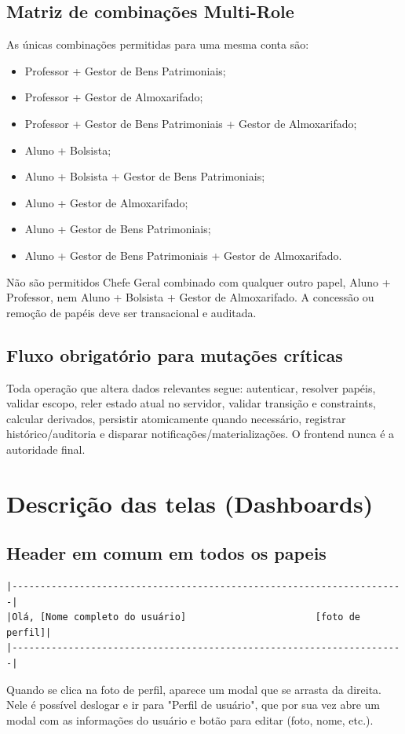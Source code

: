 \documentclass[12pt,a4paper]{article}
\begin{document}
\subsection{Matriz de combinações Multi-Role}
As únicas combinações permitidas para uma mesma conta são:
\begin{itemize}
    \item Professor + Gestor de Bens Patrimoniais;
    \item Professor + Gestor de Almoxarifado;
    \item Professor + Gestor de Bens Patrimoniais + Gestor de Almoxarifado;
    \item Aluno + Bolsista;
    \item Aluno + Bolsista + Gestor de Bens Patrimoniais;
    \item Aluno + Gestor de Almoxarifado;
    \item Aluno + Gestor de Bens Patrimoniais;
    \item Aluno + Gestor de Bens Patrimoniais + Gestor de Almoxarifado.
\end{itemize}
Não são permitidos Chefe Geral combinado com qualquer outro papel, Aluno + Professor, nem Aluno + Bolsista + Gestor de Almoxarifado. A concessão ou remoção de papéis deve ser transacional e auditada.

\subsection{Fluxo obrigatório para mutações críticas}
Toda operação que altera dados relevantes segue: autenticar, resolver papéis, validar escopo, reler estado atual no servidor, validar transição e constraints, calcular derivados, persistir atomicamente quando necessário, registrar histórico/auditoria e disparar notificações/materializações. O frontend nunca é a autoridade final.

\section{Descrição das telas (Dashboards)}
\subsection{Header em comum em todos os papeis}
\begin{verbatim}
|----------------------------------------------------------------------|
|Olá, [Nome completo do usuário]                       [foto de perfil]| 
|----------------------------------------------------------------------|
\end{verbatim}
Quando se clica na foto de perfil, aparece um modal que se arrasta da direita. Nele é possível deslogar e ir para "Perfil de usuário", que por sua vez abre um modal com as informações do usuário e botão para editar (foto, nome, etc.).
\end{document}
